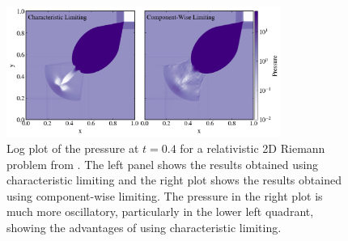 \documentclass[letterpaper]{jpconf}
\begin{document}
\begin{figure}
  \centering
  \includegraphics[width=0.8\textwidth]{Images/2DRP.png}
   \caption{Log plot of the pressure at $t=0.4$ for a relativistic 2D Riemann problem from \cite{DelZannaBucciantini2002}. The left panel shows the results obtained using characteristic limiting and the right plot shows the results obtained using component-wise limiting. The pressure in the right plot is much more oscillatory, particularly in the lower left quadrant, showing the advantages of using characteristic limiting.}
   \label{Fig:2DRP}
 \end{figure}
 
\end{document}
